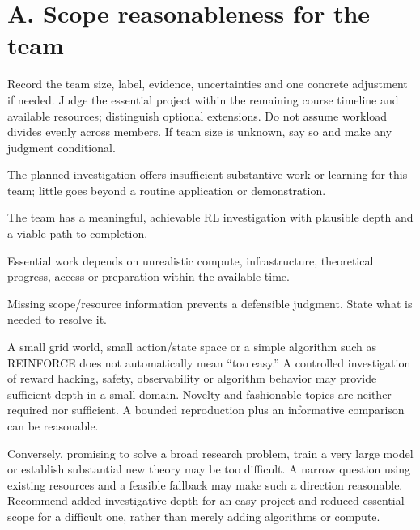 \documentclass{article}
\begin{document}
\section*{A. Scope reasonableness for the team}
Record the team size, label, evidence, uncertainties and one concrete adjustment if needed. Judge the essential project within the remaining course timeline and available resources; distinguish optional extensions. Do not assume workload divides evenly across members. If team size is unknown, say so and make any judgment conditional.
\begin{description}[style=nextline]
\item[Too easy.] The planned investigation offers insufficient substantive work or learning for this team; little goes beyond a routine application or demonstration.
\item[Reasonable.] The team has a meaningful, achievable RL investigation with plausible depth and a viable path to completion.
\item[Too difficult / too time-consuming.] Essential work depends on unrealistic compute, infrastructure, theoretical progress, access or preparation within the available time.
\item[Insufficient information.] Missing scope/resource information prevents a defensible judgment. State what is needed to resolve it.
\end{description}
A small grid world, small action/state space or a simple algorithm such as REINFORCE does not automatically mean ``too easy.'' A controlled investigation of reward hacking, safety, observability or algorithm behavior may provide sufficient depth in a small domain. Novelty and fashionable topics are neither required nor sufficient. A bounded reproduction plus an informative comparison can be reasonable.

Conversely, promising to solve a broad research problem, train a very large model or establish substantial new theory may be too difficult. A narrow question using existing resources and a feasible fallback may make such a direction reasonable. Recommend added investigative depth for an easy project and reduced essential scope for a difficult one, rather than merely adding algorithms or compute.
\end{document}
